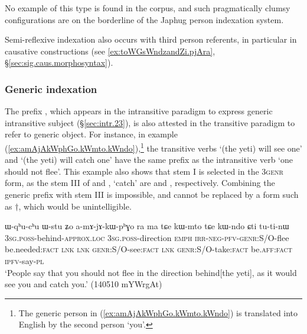 No example of this type is found in the corpus, and  such pragmatically clumsy configurations are on the borderline of the  Japhug person indexation system.

Semi-reflexive indexation also occurs with third person referents, in particular in causative constructions (see \ref{ex:toWGsWndzandZi.pjAra}, §\ref{sec:sig.caus.morphosyntax}).
 
\subsubsection{Generic indexation} \label{sec:indexation.generic.tr}
   
The prefix , which appears in the intransitive paradigm to express generic intransitive subject (§\ref{sec:intr.23}), is also attested in the transitive paradigm to refer to generic object. For instance, in example (\ref{ex:amAjAkWphGo.kWmto.kWndo}),\footnote{The generic person in (\ref{ex:amAjAkWphGo.kWmto.kWndo}) is translated into English by the second person `you'. } the transitive verbs  `(the yeti) will see one' and  `(the yeti) will catch one' have the same  prefix as the intransitive verb  `one should not flee'. This example also shows that stem I is selected in the 3\fl{}\textsc{genr} form, as the stem III of  and , `catch' are  and , respectively. Combining the generic  prefix with stem III is impossible, and  cannot be replaced by a form such as $\dagger$, which would be unintelligible.

\begin{exe}
\ex   \label{ex:amAjAkWphGo.kWmto.kWndo}
\gll ɯ-qʰu-cʰu ɯ-stu ʑo a-mɤ-jɤ-kɯ-pʰɣo ra ma tɕe kɯ-mto tɕe kɯ-ndo ɕti tu-ti-nɯ \\
\textsc{3sg}.\textsc{poss}-behind-\textsc{approx}.\textsc{loc}  \textsc{3sg}.\textsc{poss}-direction \textsc{emph} \textsc{irr}-\textsc{neg}-\textsc{pfv}-\textsc{genr}:S/O-flee be.needed:\textsc{fact} \textsc{lnk} \textsc{lnk}
\textsc{genr}:S/O-see:\textsc{fact} \textsc{lnk} \textsc{genr}:S/O-take:\textsc{fact} be.\textsc{aff}:\textsc{fact} \textsc{ipfv}-say-\textsc{pl} \\
\glt `People say that you should not flee in the direction behind[the yeti], as it would see you and catch you.' (140510 mYWrgAt)
\end{exe}


